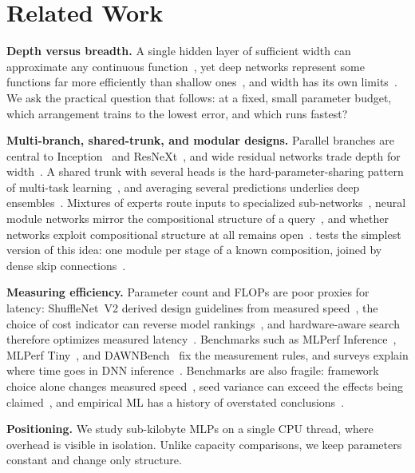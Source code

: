 \section{Related Work}
\label{sec:related}

\textbf{Depth versus breadth.} A single hidden layer of sufficient width can approximate any continuous
function~\cite{cybenko1989approximation}, yet deep networks represent some functions far more efficiently than
shallow ones~\cite{eldan2016power}, and width has its own limits~\cite{lu2017expressive}. We ask the practical
question that follows: at a fixed, small parameter budget, which arrangement trains to the lowest error, and which
runs fastest?

\textbf{Multi-branch, shared-trunk, and modular designs.} Parallel branches are central to
Inception~\cite{szegedy2015going} and ResNeXt~\cite{xie2017resnext}, and wide residual networks trade depth for
width~\cite{zagoruyko2016wide}. A shared trunk with several heads is the hard-parameter-sharing pattern of multi-task
learning~\cite{caruana1997multitask}, and averaging several predictions underlies deep
ensembles~\cite{lakshminarayanan2017simple}. Mixtures of experts route inputs to specialized
sub-networks~\cite{jacobs1991adaptive,shazeer2017outrageously}, neural module networks mirror the compositional
structure of a query~\cite{andreas2016neural}, and whether networks exploit compositional structure at all remains
open~\cite{hupkes2020compositionality,pfeiffer2023modular}. \HB tests the simplest version of this idea: one module
per stage of a known composition, joined by dense skip connections~\cite{he2016resnet,huang2017densenet}.

\textbf{Measuring efficiency.} Parameter count and FLOPs are poor proxies for latency: ShuffleNet~V2 derived design
guidelines from measured speed~\cite{ma2018shufflenetv2}, the choice of cost indicator can reverse model
rankings~\cite{dehghani2022efficiency}, and hardware-aware search therefore optimizes measured
latency~\cite{tan2019mnasnet}. Benchmarks such as MLPerf Inference~\cite{reddi2020mlperf}, MLPerf
Tiny~\cite{banbury2021mlperftiny}, and DAWNBench~\cite{coleman2019dawnbench} fix the measurement rules, and surveys
explain where time goes in DNN inference~\cite{sze2017efficient}. Benchmarks are also fragile: framework choice alone
changes measured speed~\cite{shi2016benchmarking}, seed variance can exceed the effects being
claimed~\cite{bouthillier2021accounting}, and empirical ML has a history of overstated
conclusions~\cite{lipton2019troubling}.

\textbf{Positioning.} We study sub-kilobyte MLPs on a single CPU thread, where overhead is visible in isolation.
Unlike capacity comparisons, we keep parameters constant and change only structure.
